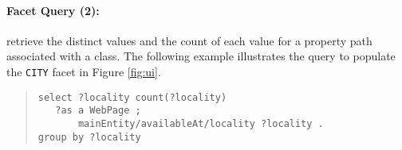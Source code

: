 \paragraph{Facet Query (2):} retrieve the distinct values and the count of each value for a property path associated with a class.
The following example illustrates the query to populate the \verb|CITY| facet in Figure \ref{fig:ui}.
\begin{quote}
{\footnotesize
\begin{verbatim}
select ?locality count(?locality)
   ?as a WebPage ;
       mainEntity/availableAt/locality ?locality .
group by ?locality
\end{verbatim}}
\end{quote}